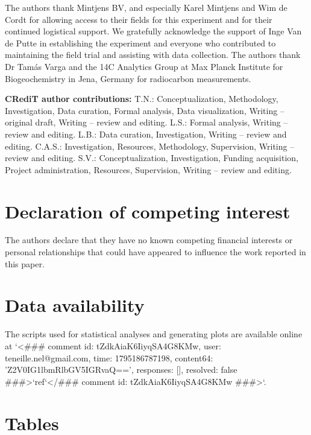 \documentclass[preprint,12pt]{elsarticle}
\begin{document}
The authors thank Mintjens BV, and especially Karel Mintjens and Wim de Cordt for allowing access to their fields for this experiment and for their continued logistical support. We gratefully acknowledge the support of Inge Van de Putte in establishing the experiment and everyone who contributed to maintaining the field trial and assisting with data collection. The authors thank Dr Tam\'as Varga and the 14C Analytics Group at Max Planck Institute for Biogeochemistry in Jena, Germany for radiocarbon measurements. 

  
\textbf{CRediT author contributions:} T.N.: Conceptualization, Methodology, Investigation, Data curation, Formal analysis, Data visualization, Writing – original draft, Writing – review and editing. L.S.: Formal analysis, Writing – review and editing. L.B.: Data curation, Investigation, Writing – review and editing. C.A.S.: Investigation, Resources, Methodology, Supervision, Writing – review and editing. S.V.: Conceptualization, Investigation, Funding acquisition, Project administration, Resources, Supervision, Writing – review and editing. 


\section*{Declaration of competing interest}

The authors declare that they have no known competing financial interests or personal relationships that could have appeared to influence the work reported in this paper.

\section*{Data availability}

The scripts used for statistical analyses and generating plots are available online at `<### comment id: tZdkAiaK6IiyqSA4G8KMw, user: teneille.nel@gmail.com, time: 1795186787198, content64: 'Z2V0IG1lbmRlbGV5IGRvaQ==', responses: [], resolved: false ###>`ref`</### comment id: tZdkAiaK6IiyqSA4G8KMw ###>`.

\clearpage
\section*{Tables}
\end{document}
